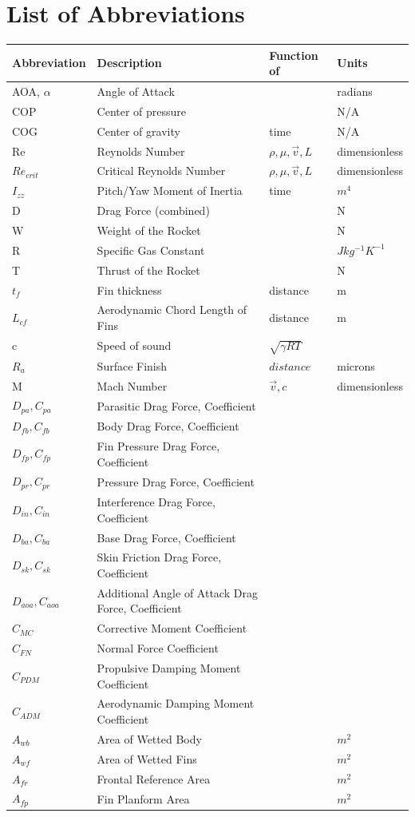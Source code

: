 \documentclass[]{book}
\begin{document}
{
\hypersetup{linkcolor=black}
\setcounter{tocdepth}{2}
\tableofcontents
\clearpage
}
\listoftables
\listoffigures
\clearpage
\section{List of Abbreviations}\label{list-of-abbreviations}

\begin{longtable}[c]{@{}llll@{}}
\toprule
Abbreviation & Description & Function of & Units\tabularnewline
\midrule
\endhead
AOA, \(\alpha\) & Angle of Attack & & radians\tabularnewline
COP & Center of pressure & & N/A\tabularnewline
COG & Center of gravity & time & N/A\tabularnewline
Re & Reynolds Number & \( \rho,\mu,\vec{v},L \) &
dimensionless\tabularnewline
\(Re_{crit}\) & Critical Reynolds Number & \( \rho,\mu,\vec{v},L \) &
dimensionless\tabularnewline
\(I_{zz}\) & Pitch/Yaw Moment of Inertia & time & \(m^4\)\tabularnewline
D & Drag Force (combined) & & N\tabularnewline
W & Weight of the Rocket & & N\tabularnewline
R & Specific Gas Constant & & \(J kg^{-1} K^{-1}\)\tabularnewline
T & Thrust of the Rocket & & N\tabularnewline
\(t_f\) & Fin thickness & distance & m\tabularnewline
\(L_{cf}\) & Aerodynamic Chord Length of Fins & distance &
m\tabularnewline
c & Speed of sound & \( \sqrt{\gamma RT} \) &\tabularnewline
\(R_a\) & Surface Finish & \( distance \) & microns\tabularnewline
M & Mach Number & \( \vec{v}, c \) & dimensionless\tabularnewline
\(D_{pa}, C_{pa}\) & Parasitic Drag Force, Coefficient &
&\tabularnewline
\(D_{fb}, C_{fb}\) & Body Drag Force, Coefficient & &\tabularnewline
\(D_{fp}, C_{fp}\) & Fin Pressure Drag Force, Coefficient &
&\tabularnewline
\(D_{pr}, C_{pr}\) & Pressure Drag Force, Coefficient & &\tabularnewline
\(D_{in}, C_{in}\) & Interference Drag Force, Coefficient &
&\tabularnewline
\(D_{ba}, C_{ba}\) & Base Drag Force, Coefficient & &\tabularnewline
\(D_{sk}, C_{sk}\) & Skin Friction Drag Force, Coefficient &
&\tabularnewline
\(D_{aoa}, C_{aoa}\) & Additional Angle of Attack Drag Force,
Coefficient & &\tabularnewline
\(C_{MC}\) & Corrective Moment Coefficient & &\tabularnewline
\(C_{FN}\) & Normal Force Coefficient & &\tabularnewline
\(C_{PDM}\) & Propulsive Damping Moment Coefficient & &\tabularnewline
\(C_{ADM}\) & Aerodynamic Damping Moment Coefficient & &\tabularnewline
\(A_{wb}\) & Area of Wetted Body & & \(m^2\)\tabularnewline
\(A_{wf}\) & Area of Wetted Fins & & \(m^2\)\tabularnewline
\(A_{fr}\) & Frontal Reference Area & & \(m^2\)\tabularnewline
\(A_{fp}\) & Fin Planform Area & & \(m^2\)\tabularnewline

\end{longtable}
\end{document}
